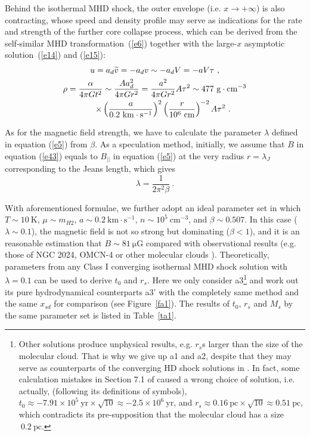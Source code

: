 \documentclass[fleqn,usenatbib]{mnras}
\begin{document}
Behind the isothermal MHD shock, the outer envelope (i.e. $x\rightarrow +\infty$) is also contracting, whose speed and density profile may serve as indications for the rate and strength of the further core collapse process, which can be derived from the self-similar MHD transformation~(\ref{e6}) together with the large-$x$ asymptotic solution~(\ref{e14}) and (\ref{e15}):
\begin{gather}
u=a_{d}\widetilde{v}=-a_{d}v\sim -a_{d}V=-aV\tau\ , \label{e47}\\
\rho=\frac{\alpha}{4\pi Gt^{2}}\sim \frac{A a_{d}^{2}}{4\pi Gr^{2}}=\frac{a^{2}}{4\pi Gr^{2}}A\tau^{2}\sim 477~\mathrm{g\cdot cm^{-3}}\notag\\
\qquad\times\left(\frac{a}{0.2~\mathrm{km\cdot s^{-1}}}\right)^{2}\left(\frac{r}{10^{6}~\mathrm{cm}}\right)^{-2}A\tau^{2}\ .\label{e48}
\end{gather} 

As for the magnetic field strength, we have to calculate the parameter $\lambda$ defined in equation (\ref{e5}) from $\beta$. 
As a speculation method, initially, we assume that $B$ in equation (\ref{e43}) equals to $B_{||}$ in equation (\ref{e5}) at the very radius $r=\lambda_{J}$ corresponding to the Jeans length, which gives
\begin{equation}
\lambda=\frac{1}{2\pi^{2}\beta}\ .
\end{equation}

With aforementioned formulae, we further adopt an ideal parameter set in which $T\sim 10~\mathrm{K}$, $\mu\sim m_{H2}$, $a\sim 0.2~\mathrm{km\cdot s^{-1}}$, $n\sim 10^{5}~\mathrm{cm^{-3}}$, and $\beta\sim 0.507$. In this case ($\lambda\sim 0.1$), the magnetic field is not so strong but dominating ($\beta<1$), and it is an reasonable estimation that $B\sim 81~\mathrm{\mu G}$ compared with observational results (e.g. those of NGC 2024, OMCN-4 \citep{crutcher1999magnetic} or other molecular clouds \citep{bourke2001new}). Theoretically, parameters from any Class I converging isothermal MHD shock solution with $\lambda=0.1$ can be used to derive $t_{0}$ and $r_{s}$. Here we only consider a3\footnote{Other solutions produce unphysical results, e.g. $r_{s}$s larger than the size of the molecular cloud. That is why we give up a1 and a2, despite that they may serve as counterparts of the converging HD shock solutions in \citet{lou2014self}. In fact, some calculation mistakes in Section 7.1 of \citet{lou2014self} caused a wrong choice of solution, i.e. actually, (following its definitions of symbols), $t_{0}\approx -7.91\times 10^{5}~\mathrm{yr} \times\sqrt{10}\approx -2.5\times 10^{6}~\mathrm{yr}$, and $r_{s}\approx 0.16~\mathrm{pc}\times \sqrt{10}\approx 0.51~\mathrm{pc}$, which contradicts its pre-supposition that the molecular cloud has a size$~0.2~\mathrm{pc}$.} and work out its pure hydrodynamical counterparts a3' with the completely same method and the same $x_{sd}$ for comparison (see Figure~\ref{fa1}). The results of $t_{0}$, $r_{s}$ and $M_{s}$ by the same parameter set is listed in Table~\ref{ta1}.
\end{document}
